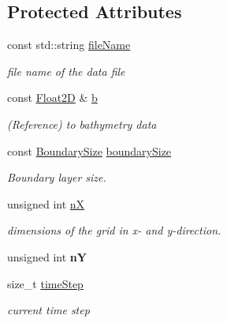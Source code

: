 \subsection*{Protected Attributes}
\begin{DoxyCompactItemize}
\item 
\hypertarget{classio_1_1Writer_a93b978e8cbfc6bcf6dbfdc3f393d300a}{const std\-::string \hyperlink{classio_1_1Writer_a93b978e8cbfc6bcf6dbfdc3f393d300a}{file\-Name}}\label{classio_1_1Writer_a93b978e8cbfc6bcf6dbfdc3f393d300a}

\begin{DoxyCompactList}\small\item\em file name of the data file \end{DoxyCompactList}\item 
\hypertarget{classio_1_1Writer_a1f5d4ab8728ae1c2ceba52c6c822d0bc}{const \hyperlink{classFloat2D}{Float2\-D} \& \hyperlink{classio_1_1Writer_a1f5d4ab8728ae1c2ceba52c6c822d0bc}{b}}\label{classio_1_1Writer_a1f5d4ab8728ae1c2ceba52c6c822d0bc}

\begin{DoxyCompactList}\small\item\em (Reference) to bathymetry data \end{DoxyCompactList}\item 
\hypertarget{classio_1_1Writer_a7cf701232192c20c41cbb4454601c219}{const \hyperlink{structio_1_1BoundarySize}{Boundary\-Size} \hyperlink{classio_1_1Writer_a7cf701232192c20c41cbb4454601c219}{boundary\-Size}}\label{classio_1_1Writer_a7cf701232192c20c41cbb4454601c219}

\begin{DoxyCompactList}\small\item\em Boundary layer size. \end{DoxyCompactList}\item 
\hypertarget{classio_1_1Writer_a3929ac486db236727ffe1c012d3ed765}{unsigned int \hyperlink{classio_1_1Writer_a3929ac486db236727ffe1c012d3ed765}{n\-X}}\label{classio_1_1Writer_a3929ac486db236727ffe1c012d3ed765}

\begin{DoxyCompactList}\small\item\em dimensions of the grid in x-\/ and y-\/direction. \end{DoxyCompactList}\item 
\hypertarget{classio_1_1Writer_ac1e4628c0f4ac2185cfb011588cec405}{unsigned int {\bfseries n\-Y}}\label{classio_1_1Writer_ac1e4628c0f4ac2185cfb011588cec405}

\item 
\hypertarget{classio_1_1Writer_aa21f3ee8a54cf9278d711fe4f454f45c}{size\-\_\-t \hyperlink{classio_1_1Writer_aa21f3ee8a54cf9278d711fe4f454f45c}{time\-Step}}\label{classio_1_1Writer_aa21f3ee8a54cf9278d711fe4f454f45c}

\begin{DoxyCompactList}\small\item\em current time step \end{DoxyCompactList}\end{DoxyCompactItemize}


